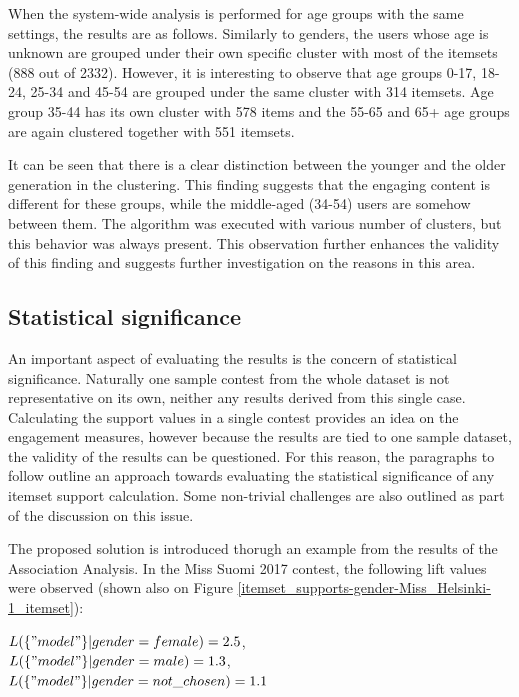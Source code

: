 When the system-wide analysis is performed for age groups with the same settings, the results are as follows. Similarly to genders, the users whose age is unknown are grouped under their own specific cluster with most of the itemsets (888 out of 2332). However, it is interesting to observe that age groups 0-17, 18-24, 25-34 and 45-54 are grouped under the same cluster with 314 itemsets. Age group 35-44 has its own cluster with 578 items and the 55-65 and 65+ age groups are again clustered together with 551 itemsets. 

It can be seen that there is a clear distinction between the younger and the older generation in the clustering. This finding suggests that the engaging content is different for these groups, while the middle-aged (34-54) users are somehow between them. The algorithm was executed with various number of clusters, but this behavior was always present. This observation further enhances the validity of this finding and suggests further investigation on the reasons in this area.

\subsection{Statistical significance}
An important aspect of evaluating the results is the concern of statistical significance. Naturally one sample contest from the whole dataset is not representative on its own, neither any results derived from this single case. Calculating the support values in a single contest provides an idea on the engagement measures, however because the results are tied to one sample dataset, the validity of the results can be questioned. For this reason, the paragraphs to follow outline an approach towards evaluating the statistical significance of any itemset support calculation. Some non-trivial challenges are also outlined as part of the discussion on this issue. 

The proposed solution is introduced thorugh an example from the results of the Association Analysis. In the Miss Suomi 2017 contest, the following lift values were observed (shown also on Figure \ref{itemset_supports-gender-Miss_Helsinki-1_itemset}): 

\begin{center}
    $L(\{"model"\}|gender=female)=2.5$, \\
    $L(\{"model"\}|gender=male)=1.3$, \\
    $L(\{"model"\}|gender=not\_chosen)=1.1$
\end{center}

